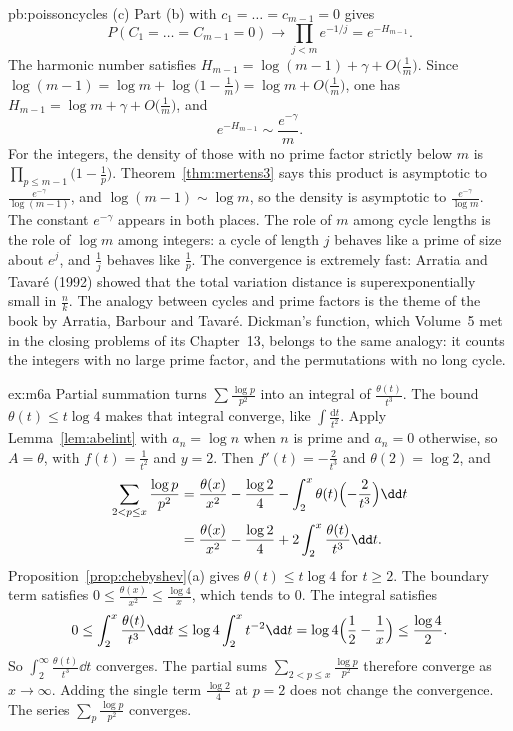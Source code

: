\begin{solution}{pb:poissoncycles}
(c) Part (b) with $c_1=\dots=c_{m-1}=0$ gives
\[
P(C_1=\dots=C_{m-1}=0)\to\prod_{j<m}e^{-1/j}=e^{-H_{m-1}}.
\]
The harmonic number satisfies $H_{m-1}=\log(m-1)+\gamma+O\bigl(\frac1m\bigr)$. Since $\log(m-1)=\log m+\log\bigl(1-\frac1m\bigr)=\log m+O\bigl(\frac1m\bigr)$, one has $H_{m-1}=\log m+\gamma+O\bigl(\frac1m\bigr)$, and
\[
e^{-H_{m-1}}\sim\frac{e^{-\gamma}}m.
\]
For the integers, the density of those with no prime factor strictly below $m$ is $\prod_{p\le m-1}\bigl(1-\frac1p\bigr)$. Theorem~\ref{thm:mertens3} says this product is asymptotic to $\frac{e^{-\gamma}}{\log(m-1)}$, and $\log(m-1)\sim\log m$, so the density is asymptotic to $\frac{e^{-\gamma}}{\log m}$. The constant $e^{-\gamma}$ appears in both places. The role of $m$ among cycle lengths is the role of $\log m$ among integers: a cycle of length $j$ behaves like a prime of size about $e^j$, and $\frac1j$ behaves like $\frac1p$.
\leads The convergence is extremely fast: Arratia and Tavar\'e (1992) showed that the total variation distance is superexponentially small in $\frac nk$. The analogy between cycles and prime factors is the theme of the book by Arratia, Barbour and Tavar\'e. Dickman's function, which Volume~5 met in the closing problems of its Chapter~13, belongs to the same analogy: it counts the integers with no large prime factor, and the permutations with no long cycle.
\end{solution}

\begin{solution}{ex:m6a}
\idea Partial summation turns $\sum\frac{\log p}{p^2}$ into an integral of $\frac{\theta(t)}{t^3}$. The bound $\theta(t)\le t\log 4$ makes that integral converge, like $\int\frac{\mathrm dt}{t^2}$.
\writeup Apply Lemma~\ref{lem:abelint} with $a_n=\log n$ when $n$ is prime and $a_n=0$ otherwise, so $A=\theta$, with $f(t)=\frac1{t^2}$ and $y=2$. Then $f'(t)=-\frac2{t^3}$ and $\theta(2)=\log 2$, and
\begin{align*}
\sum_{2<p\le x}\frac{\log p}{p^2}
&=\frac{\theta(x)}{x^2}-\frac{\log 2}4-\int_2^x\theta(t)\Bigl(-\frac2{t^3}\Bigr)\dd t\\
&=\frac{\theta(x)}{x^2}-\frac{\log 2}4+2\int_2^x\frac{\theta(t)}{t^3}\dd t.
\end{align*}
Proposition~\ref{prop:chebyshev}(a) gives $\theta(t)\le t\log 4$ for $t\ge 2$. The boundary term satisfies $0\le\frac{\theta(x)}{x^2}\le\frac{\log 4}x$, which tends to $0$. The integral satisfies
\[
0\le\int_2^x\frac{\theta(t)}{t^3}\dd t\le\log 4\int_2^x t^{-2}\dd t=\log 4\Bigl(\frac12-\frac1x\Bigr)\le\frac{\log 4}2.
\]
So $\int_2^\infty\frac{\theta(t)}{t^3}\dd t$ converges. The partial sums $\sum_{2<p\le x}\frac{\log p}{p^2}$ therefore converge as $x\to\infty$. Adding the single term $\frac{\log 2}4$ at $p=2$ does not change the convergence. The series $\sum_p\frac{\log p}{p^2}$ converges.
\end{solution}

